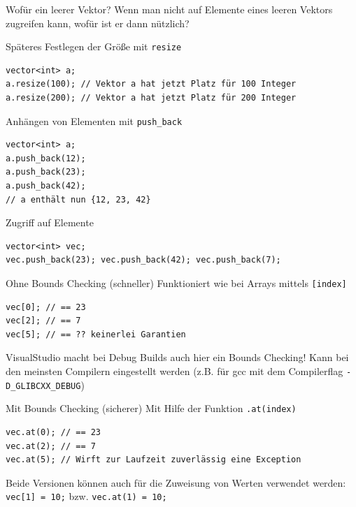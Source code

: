 \documentclass[presentation]{beamer}
\begin{document}
\begin{frame}[fragile,label={sec:orgb3a0a93}]{Wofür ein leerer Vektor?}
 Wenn man nicht auf Elemente eines leeren Vektors zugreifen kann, wofür
ist er dann nützlich?
\begin{exampleblock}{Späteres Festlegen der Größe mit {\color{solarizedYellow}\texttt{resize}}}
\begin{verbatim}
vector<int> a;
a.resize(100); // Vektor a hat jetzt Platz für 100 Integer
a.resize(200); // Vektor a hat jetzt Platz für 200 Integer
\end{verbatim}
\end{exampleblock}
\begin{exampleblock}{Anhängen von Elementen mit {\color{solarizedYellow}\texttt{push\_back}}}
\begin{verbatim}
vector<int> a;
a.push_back(12);
a.push_back(23);
a.push_back(42);
// a enthält nun {12, 23, 42}
\end{verbatim}
\end{exampleblock}
\end{frame}
\begin{frame}[fragile,label={sec:org40fd98f}]{Zugriff auf Elemente}
 \begin{verbatim}
vector<int> vec;
vec.push_back(23); vec.push_back(42); vec.push_back(7);
\end{verbatim}
\begin{block}{Ohne Bounds Checking (schneller)}
Funktioniert wie bei Arrays mittels {\color{solarizedYellow}\texttt{[index]}}
\begin{verbatim}
vec[0]; // == 23
vec[2]; // == 7
vec[5]; // == ?? keinerlei Garantien
\end{verbatim}
\tiny VisualStudio macht bei Debug Builds auch hier ein Bounds
Checking! Kann bei den meinsten Compilern eingestellt werden (z.B. für
gcc mit dem Compilerflag {\color{solarizedYellow}\texttt{-D\_GLIBCXX\_DEBUG}})
\end{block}
\begin{block}{Mit Bounds Checking (sicherer)}
Mit Hilfe der Funktion {\color{solarizedYellow}\texttt{.at(index)}}
\begin{verbatim}
vec.at(0); // == 23
vec.at(2); // == 7
vec.at(5); // Wirft zur Laufzeit zuverlässig eine Exception
\end{verbatim}
\end{block}
Beide Versionen können auch für die Zuweisung von Werten verwendet
werden: {\color{solarizedYellow}\texttt{vec[1] = 10;} }bzw. {\color{solarizedYellow}\texttt{vec.at(1) = 10;}}
\end{frame}
\end{document}
